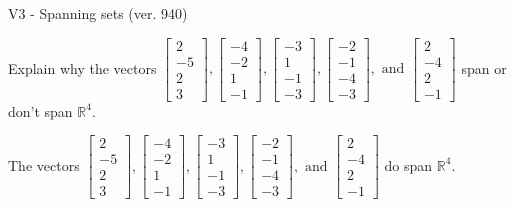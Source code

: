\begin{exercise}
  \begin{exerciseTitle}V3 - Spanning sets (ver. 940)\end{exerciseTitle}
  \begin{exerciseStatement}
    Explain why the vectors \(\left[\begin{array}{r}
2 \\
-5 \\
2 \\
3
\end{array}\right] , \left[\begin{array}{r}
-4 \\
-2 \\
1 \\
-1
\end{array}\right] , \left[\begin{array}{r}
-3 \\
1 \\
-1 \\
-3
\end{array}\right] , \left[\begin{array}{r}
-2 \\
-1 \\
-4 \\
-3
\end{array}\right] , \text{ and } \left[\begin{array}{r}
2 \\
-4 \\
2 \\
-1
\end{array}\right]\) span or don't span \(\mathbb{R}^4\). 
	


  \end{exerciseStatement}
  \begin{exerciseAnswer}
   The vectors \(\left[\begin{array}{r}
2 \\
-5 \\
2 \\
3
\end{array}\right] , \left[\begin{array}{r}
-4 \\
-2 \\
1 \\
-1
\end{array}\right] , \left[\begin{array}{r}
-3 \\
1 \\
-1 \\
-3
\end{array}\right] , \left[\begin{array}{r}
-2 \\
-1 \\
-4 \\
-3
\end{array}\right] , \text{ and } \left[\begin{array}{r}
2 \\
-4 \\
2 \\
-1
\end{array}\right]\) 
  	 do  
	span \(\mathbb{R}^4\).
  



\end{exerciseAnswer}
\end{exercise}
